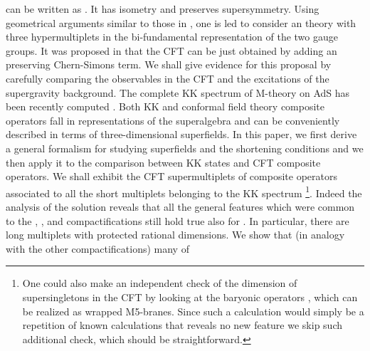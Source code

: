 \documentclass[a4paper,12pt]{article}
\def\n010{N^{0,1,0}}
\begin{document}
\myHighlight{$\n010$}\coordHE{} can be written as \coordHE{} \cite{castn010}.
It has isometry \coordHE{} and preserves
\coordHE{} supersymmetry.
Using geometrical arguments similar to those in \cite{witkleb,3dcft},
one is led to consider an \coordHE{} theory \coordHE{} with three hypermultiplets in the bi-fundamental
representation of the two gauge groups.
It was proposed in \cite{gukov} that the \coordHE{} CFT can be
just obtained by adding an \coordHE{} preserving Chern-Simons term.
We shall give evidence for this proposal by carefully comparing the
observables in the CFT and the excitations of the supergravity
background.
The complete KK spectrum of M-theory on AdS\coordHE{}
has been recently computed \cite{n010massspectrum,osp34}.
Both KK and conformal field theory composite operators fall in
representations of the superalgebra \coordHE{} and can be
conveniently described in terms of three-dimensional \coordHE{}
superfields.
In this paper, we first derive a general formalism for studying
\coordHE{} superfields and the \coordHE{} shortening
conditions and we then apply it to the comparison between KK states
and CFT composite operators.
We shall exhibit the CFT supermultiplets of composite operators
associated to all the short multiplets belonging to the KK
spectrum \footnote{One could also make an independent check of
the dimension of supersingletons in the CFT by looking at the
baryonic operators \cite{gubserkleb,3dcft}, which can be realized
as wrapped M5-branes. Since such a calculation would simply
be a repetition of known calculations that reveals no new feature
we skip such additional check, which should be straightforward.}.
Indeed the analysis of the \coordHE{} solution reveals that all
the general features which were common to the \coordHE{}, \coordHE{},
\coordHE{} and \coordHE{} compactifications \cite{gubser,sergiotorino,
3dcft,poliv52} still hold true also for \coordHE{}.
In particular, there are long multiplets with protected rational
dimensions.
We show that (in analogy with the other compactifications) many of
\end{document}
